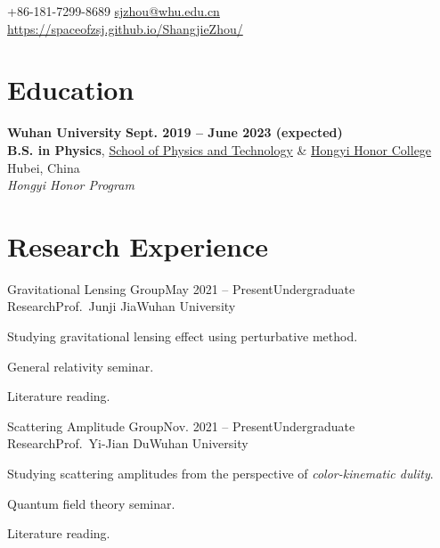 \documentclass{resume}
\begin{document}
\begin{center}
    \contact
    {+86-181-7299-8689}
    {\href{mailto:sjzhou@whu.edu.cn}{sjzhou@whu.edu.cn}}
    {\href{https://spaceofzsj.github.io/ShangjieZhou/}{https://spaceofzsj.github.io/ShangjieZhou/}}
\end{center}

\section{Education}
\begin{content}

    {\bf Wuhan University} \hfill {\bf Sept. 2019 -- June 2023 (expected)} \\
    {\bf B.S. in Physics}, \href{https://physics.whu.edu.cn/index.htm}{School of Physics and Technology} \& \href{https://hyxt.whu.edu.cn}{Hongyi Honor College} \hfill Hubei, China\\
    {\em Hongyi Honor Program}

    \sectionlineskip
\end{content}

\section{Research Experience}
\begin{content}

    \begin{position}{Gravitational Lensing Group}{May 2021 -- Present}{Undergraduate Research}{Prof.~Junji Jia}{Wuhan University}
        \item Studying gravitational lensing effect using perturbative method.
        \item General relativity seminar.
        \item Literature reading.
    \end{position}
    \vspace{-.5\baselineskip}

    \begin{position}{Scattering Amplitude Group}{Nov. 2021 -- Present}{Undergraduate Research}{Prof.~Yi-Jian Du}{Wuhan University}
        \item Studying scattering amplitudes from the perspective of \textit{color-kinematic dulity}.
        \item Quantum field theory seminar.
        \item Literature reading.
    \end{position}
    \vspace{-.5\baselineskip}

    \sectionlineskip
\end{content}
\end{document}
